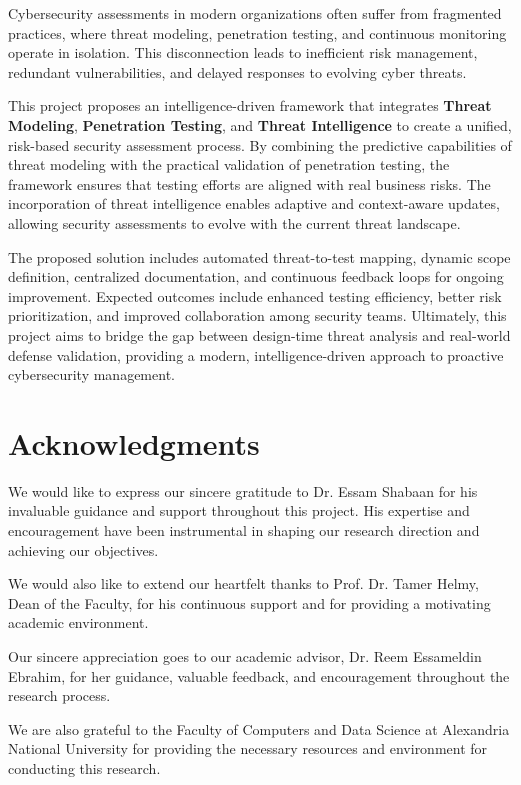 \documentclass[12pt,a4paper]{report}
\begin{document}
Cybersecurity assessments in modern organizations often suffer from fragmented practices, where threat modeling, penetration testing, and continuous monitoring operate in isolation. This disconnection leads to inefficient risk management, redundant vulnerabilities, and delayed responses to evolving cyber threats.

This project proposes an intelligence-driven framework that integrates \textbf{Threat Modeling}, \textbf{Penetration Testing}, and \textbf{Threat Intelligence} to create a unified, risk-based security assessment process. By combining the predictive capabilities of threat modeling with the practical validation of penetration testing, the framework ensures that testing efforts are aligned with real business risks. The incorporation of threat intelligence enables adaptive and context-aware updates, allowing security assessments to evolve with the current threat landscape.

The proposed solution includes automated threat-to-test mapping, dynamic scope definition, centralized documentation, and continuous feedback loops for ongoing improvement. Expected outcomes include enhanced testing efficiency, better risk prioritization, and improved collaboration among security teams. Ultimately, this project aims to bridge the gap between design-time threat analysis and real-world defense validation, providing a modern, intelligence-driven approach to proactive cybersecurity management.

\chapter*{Acknowledgments}

We would like to express our sincere gratitude to Dr. Essam Shabaan for his invaluable guidance and support throughout this project. His expertise and encouragement have been instrumental in shaping our research direction and achieving our objectives.

We would also like to extend our heartfelt thanks to Prof. Dr. Tamer Helmy, Dean of the Faculty, for his continuous support and for providing a motivating academic environment.

Our sincere appreciation goes to our academic advisor, Dr. Reem Essameldin Ebrahim, for her guidance, valuable feedback, and encouragement throughout the research process.

We are also grateful to the Faculty of Computers and Data Science at Alexandria National University for providing the necessary resources and environment for conducting this research.
\end{document}
